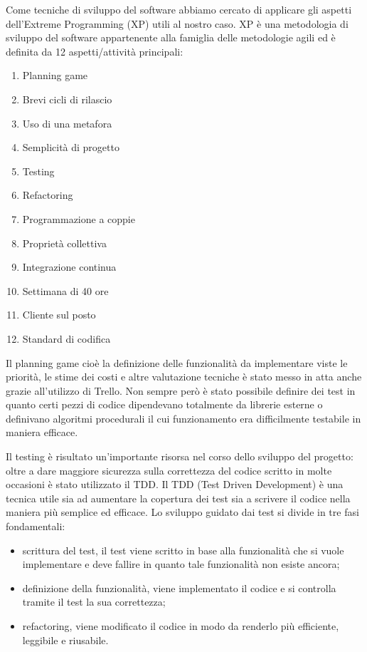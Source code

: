 \documentclass[12pt]{report}
\begin{document}
Come tecniche di sviluppo del software abbiamo cercato di applicare gli aspetti dell'Extreme Programming (XP) utili al nostro caso. XP è una metodologia di sviluppo del software appartenente alla famiglia delle metodologie agili ed è definita da 12 aspetti/attività principali:
\begin{enumerate}
\item Planning game
\item Brevi cicli di rilascio
\item Uso di una metafora
\item Semplicità di progetto
\item Testing
\item Refactoring
\item Programmazione a coppie 
\item Proprietà collettiva 
\item Integrazione continua
\item Settimana di 40 ore
\item Cliente sul posto
\item Standard di codifica
\end{enumerate}

Il planning game cioè la definizione delle funzionalità da implementare viste le priorità, le stime dei costi e altre valutazione tecniche è stato messo in atta anche grazie all'utilizzo di Trello. Non sempre però è stato possibile definire dei test in quanto certi pezzi di codice dipendevano totalmente da librerie esterne o definivano algoritmi procedurali il cui funzionamento era difficilmente testabile in maniera efficace.

Il testing è risultato un'importante risorsa nel corso dello sviluppo del progetto: oltre a dare maggiore sicurezza sulla correttezza del codice scritto in molte occasioni è stato utilizzato il TDD. Il TDD (Test Driven Development) è una tecnica utile sia ad aumentare la copertura dei test sia a scrivere il codice nella maniera più semplice ed efficace. Lo sviluppo guidato dai test si divide in tre fasi fondamentali:
\begin{itemize}
\item scrittura del test, il test viene scritto in base alla funzionalità che si vuole implementare e deve fallire in quanto tale funzionalità non esiste ancora;
\item definizione della funzionalità, viene implementato il codice e si controlla tramite il test la sua correttezza;
\item refactoring, viene modificato il codice in modo da renderlo più efficiente, leggibile e riusabile.
\end{itemize} 
\end{document}
